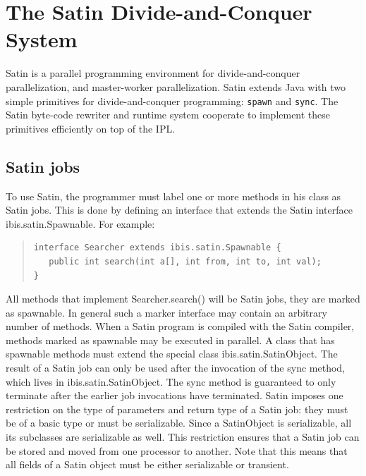 \documentclass[10pt]{article}
\newcommand{\mysection}[1]{\section{#1}\label{#1}}
\newcommand{\mysubsection}[1]{\subsection{#1}\label{#1}}
\begin{document}
\mysection{The Satin Divide-and-Conquer System}

Satin is a parallel programming environment for divide-and-conquer
parallelization, and master-worker parallelization. Satin extends Java
with two simple primitives for divide-and-conquer programming: \texttt{spawn}
and \texttt{sync}. The Satin byte-code rewriter and runtime system cooperate to
implement these primitives efficiently on top of the IPL.  

\mysubsection{Satin jobs}

To use Satin, the programmer must label one or more methods in his
class as Satin jobs. This is done by defining an interface that
extends the Satin interface ibis.satin.Spawnable. For example:

{\small
\begin{quote}
\begin{verbatim}
interface Searcher extends ibis.satin.Spawnable {
   public int search(int a[], int from, int to, int val);
}
\end{verbatim}
\end{quote}
}
\noindent

All methods that implement Searcher.search() will be Satin jobs, they
are marked as spawnable.  In general such a marker interface may
contain an arbitrary number of methods.  When a Satin program is
compiled with the Satin compiler, methods marked as spawnable may be
executed in parallel. A class that has spawnable methods 
must extend the special class ibis.satin.SatinObject.
The result of a Satin job can only be
used after the invocation of the sync method, which lives in
ibis.satin.SatinObject. The sync method is guaranteed to only
terminate after the earlier job invocations have terminated.  Satin
imposes one restriction on the type of parameters and return type of a
Satin job: they must be of a basic type or must be serializable.
Since a SatinObject is serializable, all its subclasses are
serializable as well. This restriction ensures that a Satin job can be
stored and moved from one processor to another. Note that this means that
all fields of a Satin object must be either serializable or transient.
\end{document}
